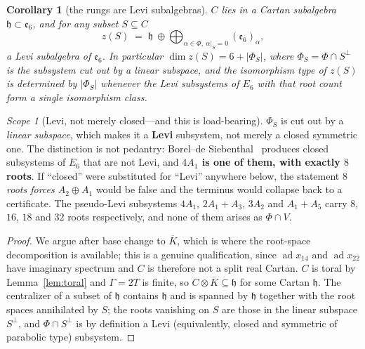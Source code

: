 \documentclass[11pt,reqno]{amsart}
\theoremstyle{plain}
\newtheorem{corollary}[theorem]{Corollary}
\theoremstyle{definition}
\theoremstyle{remark}
\newtheorem{scope}[theorem]{Scope}
\newcommand{\ee}{\mathfrak{e}}
\newcommand{\ad}{\operatorname{ad}}
\newcommand{\h}{\mathfrak{h}}
\begin{document}
\begin{corollary}[the rungs are Levi subalgebras]\label{cor:levi}
$C$ lies in a Cartan subalgebra $\h\subset\ee_6$, and for any subset $S\subseteq C$
\[
   z(S)\;=\;\h\ \oplus\!\!\bigoplus_{\alpha\in\Phi,\ \alpha|_S=0}\!\!(\ee_6)_\alpha ,
\]
a Levi subalgebra of $\ee_6$. In particular $\dim z(S)=6+\lvert\Phi_S\rvert$, where
$\Phi_S=\Phi\cap S^{\perp}$ is the subsystem cut out by a linear subspace, and the
isomorphism type of $z(S)$ is determined by $\lvert\Phi_S\rvert$ whenever the Levi
subsystems of $E_6$ with that root count form a single isomorphism class.
\end{corollary}

\begin{scope}[Levi, not merely closed---and this is load-bearing]\label{sc:pseudolevi}
$\Phi_S$ is cut out by a \emph{linear subspace}, which makes it a \textbf{Levi}
subsystem, not merely a closed symmetric one. The distinction is not pedantry:
Borel--de Siebenthal~\cite{BdS} produces closed subsystems of $E_6$ that are not Levi, and
\textbf{$4A_1$ is one of them, with exactly $8$ roots}. If ``closed'' were substituted for
``Levi'' anywhere below, the statement \emph{$8$ roots forces $A_2\oplus A_1$} would be
false and the terminus would collapse back to a certificate. The pseudo-Levi subsystems
$4A_1$, $2A_1{+}A_3$, $3A_2$ and $A_1{+}A_5$ carry $8$, $16$, $18$ and $32$ roots
respectively, and none of them arises as $\Phi\cap V$.
\end{scope}

\begin{proof}
We argue after base change to $\overline K$, which is where the root-space
decomposition is available; this is a genuine qualification, since $\ad x_{14}$ and
$\ad x_{22}$ have imaginary spectrum and $C$ is therefore not a split real Cartan.
$C$ is toral by Lemma~\ref{lem:toral} and $\Gamma=2T$ is finite, so
$C\otimes\overline K\subseteq\h$ for some Cartan $\h$. The centralizer of a subset of $\h$ contains $\h$ and is spanned by
$\h$ together with the root spaces annihilated by $S$; the roots vanishing on $S$ are
those in the linear subspace $S^\perp$, and $\Phi\cap S^\perp$ is by definition a Levi
(equivalently, closed and symmetric of parabolic type) subsystem.
\end{proof}
\end{document}
